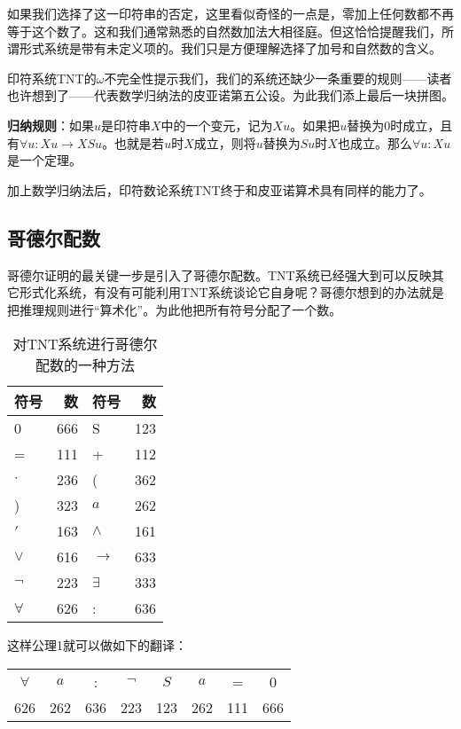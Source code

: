 \documentclass{article}
\begin{document}
如果我们选择了这一印符串的否定，这里看似奇怪的一点是，零加上任何数都不再等于这个数了。这和我们通常熟悉的自然数加法大相径庭。但这恰恰提醒我们，所谓形式系统是带有未定义项的。我们只是方便理解选择了加号和自然数的含义。

印符系统TNT的$\omega$不完全性提示我们，我们的系统还缺少一条重要的规则——读者也许想到了——代表数学归纳法的皮亚诺第五公设。为此我们添上最后一块拼图。

\textbf{归纳规则}：如果$u$是印符串$X$中的一个变元，记为$X{u}$。如果把$u$替换为0时成立，且有$\forall u: X{u} \to X{Su}$。也就是若$u$时$X$成立，则将$u$替换为$Su$时$X$也成立。那么$\forall u: X{u}$是一个定理。

加上数学归纳法后，印符数论系统TNT终于和皮亚诺算术具有同样的能力了。

\begin{Exercise}
\end{Exercise}

\subsection{哥德尔配数}
哥德尔证明的最关键一步是引入了哥德尔配数。TNT系统已经强大到可以反映其它形式化系统，有没有可能利用TNT系统谈论它自身呢？哥德尔想到的办法就是把推理规则进行“算术化”。为此他把所有符号分配了一个数。

\begin{table}[htbp]
\centering
\begin{tabular}{|l|r||l|r|}
\hline
\textbf{符号} & \textbf{数} & \textbf{符号} & \textbf{数} \\
\hline
0 & 666 & S & 123 \\
\hline
= & 111 & + & 112 \\
\hline
$\cdot$ & 236 & ( & 362 \\
\hline
) & 323 & $a$ & 262 \\
\hline
$'$ & 163 & $\land$ & 161 \\
\hline
$\lor$ & 616 & $\to$ & 633 \\
\hline
$\lnot$ & 223 & $\exists$ & 333 \\
\hline
$\forall$ & 626 & : & 636 \\
\hline
\end{tabular}
\caption{对TNT系统进行哥德尔配数的一种方法}
\end{table}

这样公理1就可以做如下的翻译：

\begin{tabular}{cccccccc}
$\forall$ & $a$ & : & $\lnot$ & $S$ & $a$ & = & 0 \\
626 & 262 & 636 & 223 & 123 & 262 & 111 & 666 \\
\end{tabular}
\end{document}
